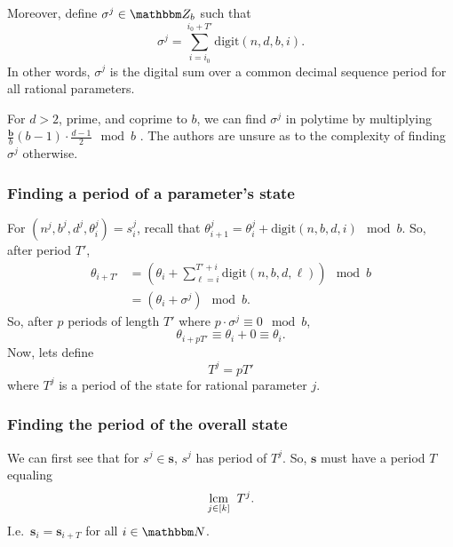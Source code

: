 \documentclass[11pt,titlepage]{article}
\newcommand{\rationalPeriodTotal}{{T}'}
\newcommand{\statePeriod}{T^j}
\newcommand{\rationalAngle}[1]{{\theta^j_{#1}}}
\newcommand{\stateNotime}[1]{s^{#1}}
\newcommand{\totalPeriod}{T}
\newcommand{\digSumPeriodic}{\sigma^j}
\newcommand{\commonBase}{{\pmb{b}}}
\begin{document}
Moreover, define $\digSumPeriodic \in \Z_b$
such that
\begin{equation}
  \digSumPeriodic = \sum_{i = i_0}^{i_0 + \rationalPeriodTotal} \mathrm{digit}(n, d, b, i).
\end{equation}
In other words, $\digSumPeriodic$ is the digital sum over 
a common decimal sequence period for all rational parameters.

\begin{remark}[Complexity]
\label{remark:digsum-complexity}
  For $d > 2$, prime, and coprime to $b$, we can find $\digSumPeriodic$
  in polytime by multiplying $\frac{\commonBase}{b}(b - 1) \cdot \frac{d-1}{2} \mod b$ \cite{OnDecSeq}. The authors are unsure
  as to the complexity of finding $\digSumPeriodic$ otherwise.
\end{remark}

\subsubsection{Finding a period of a parameter's state} %
For $(n^j, b^j, d^j, \theta_i^j) = s_i^j$,
recall that $\rationalAngle{i + 1} = \rationalAngle{i} + \mathrm{digit}(n, b, d, i) \mod b$.
So, after period $\rationalPeriodTotal$,
\begin{align*}
  \theta_{i + \rationalPeriodTotal} &= \left(\theta_{i} + \sum_{\ell = i}^{\rationalPeriodTotal + i} \mathrm{digit}(n, b, d, \ell)\right) \mod b\\
  &= \left(\theta_{i} +  \digSumPeriodic\right) \mod b.
\end{align*}
So, after $p$ periods of length $\rationalPeriodTotal$ where $p  \cdot \digSumPeriodic \equiv 0 \mod b$,
$$
\theta_{i + p\rationalPeriodTotal} \equiv \theta_i + 0 \equiv \theta_i.
$$
Now, lets define
$$
  T^j = p\rationalPeriodTotal
$$
where $T^j$ is a period of the state for rational parameter $j$.

\subsubsection{Finding the period of the overall state}
We can first see that for $\stateNotime{j} \in \pmb{s}$, $\stateNotime{j}$
has period of $\statePeriod$. So, $\pmb{s}$ must have a period $\totalPeriod$ equaling
$$
\underset{j \in [k]}{\operatorname{lcm}}\;\; T^j.
$$
I.e.\ $\pmb{s}_i = \pmb{s}_{i + T}$ for all $i \in \N$.
\end{document}
